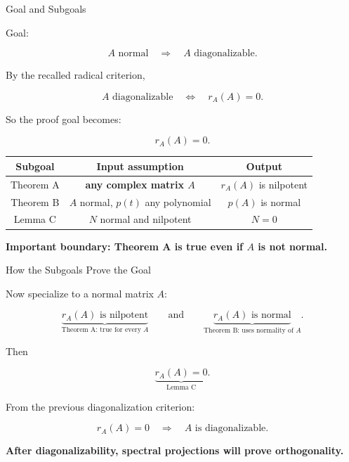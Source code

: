 \documentclass[10pt]{beamer}
\theoremstyle{definition}
\newcommand{\x}[1]{\alert{\textbf{#1}}}
\begin{document}
\begin{frame}[shrink=8]{Goal and Subgoals}

Goal:

$$
\boxed{A\text{ normal}\quad\Longrightarrow\quad A\text{ diagonalizable}.}
$$

\vfill

By the recalled radical criterion,

$$
A\text{ diagonalizable}
\quad\Longleftrightarrow\quad
r_A(A)=0.
$$

So the proof goal becomes:

$$
\boxed{r_A(A)=0.}
$$

\vfill

\begin{center}
\scriptsize
\renewcommand{\arraystretch}{1.35}
\begin{tabular}{c|c|c}
\textbf{Subgoal} & \textbf{Input assumption} & \textbf{Output}\\
\hline
Theorem A & \x{any complex matrix $A$} & $r_A(A)$ is nilpotent\\
Theorem B & $A$ normal, $p(t)$ any polynomial & $p(A)$ is normal\\
Lemma C & $N$ normal and nilpotent & $N=0$
\end{tabular}
\end{center}

\vfill

\begin{center}
\x{Important boundary: Theorem A is true even if $A$ is not normal.}
\end{center}

\end{frame}


\begin{frame}{How the Subgoals Prove the Goal}

Now specialize to a normal matrix $A$:

$$
\underbrace{r_A(A)\text{ is nilpotent}}_{\text{Theorem A: true for every }A}
\qquad\text{and}\qquad
\underbrace{r_A(A)\text{ is normal}}_{\text{Theorem B: uses normality of }A}.
$$

\vfill

Then

$$
\underbrace{r_A(A)=0}_{\text{Lemma C}}.
$$

\vfill

From the previous diagonalization criterion:

$$
r_A(A)=0
\quad\Longrightarrow\quad
A\text{ is diagonalizable}.
$$

\vfill

\begin{center}
\x{After diagonalizability, spectral projections will prove orthogonality.}
\end{center}

\end{frame}
\end{document}
